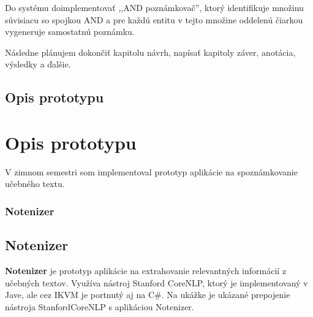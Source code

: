 Do systému doimplementovať ,,AND poznámkovač'', ktorý identifikuje množinu súvisiacu so spojkou AND a pre každú entitu v tejto množine oddelenú čiarkou vygeneruje samostatnú poznámku.

Následne plánujem dokončiť kapitolu návrh, napísať kapitoly záver, anotácia, výsledky a ďalšie.

%
%
{
	\section{Opis prototypu} 
}
{
	\chapter{Opis prototypu}
}
V zimnom semestri som implementoval prototyp aplikácie na spoznámkovanie učebného textu.

%
%
{
	\subsection{Notenizer} 
}
{
	\section{Notenizer}
}
\label{subsection:notenizer}
\textbf{Notenizer} je prototyp aplikácie na extrahovanie relevantných informácií z učebných textov. Využíva nástroj Stanford CoreNLP, ktorý je implementovaný v Jave, ale cez IKVM je portnutý aj na C\#. Na ukážke  je ukázané prepojenie nástroja StanfordCoreNLP s aplikáciou Notenizer. 
\\


